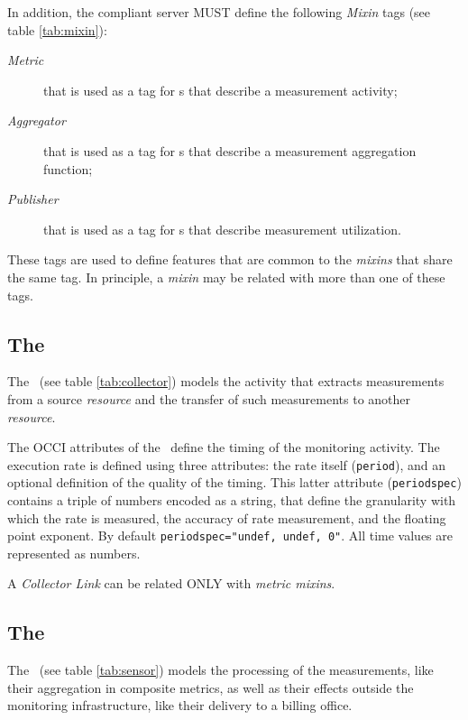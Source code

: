\documentclass[10pt]{article}  %
\begin{document}
In addition, the compliant server MUST define the following {\em Mixin} tags (see table \ref{tab:mixin}): 

\begin{description}

\item [{\em Metric}] that is used as a tag for \mi s that describe a measurement activity;

\item [{\em Aggregator}] that is used as a tag for \mi s that describe a measurement aggregation function;

\item [{\em Publisher}] that is used as a tag for \mi s that describe measurement utilization.

\end{description}

These tags are used to define features that are common to the {\em mixins} that share the same tag. In principle, a {\em mixin} may be related with more than one of these tags. 

\subsection{The \coll}



The \coll\ (see table \ref{tab:collector}) models the activity that extracts measurements from a source {\em resource} and the transfer of such measurements to another {\em resource}.

The OCCI attributes of the \coll\ define the timing of the monitoring activity.
The execution rate is defined using three attributes: the rate itself (\verb|period|), and an optional definition of the quality of the timing. This latter attribute (\verb|periodspec|) contains a triple of numbers encoded as a string, that define the granularity with which the rate is measured, the accuracy of rate measurement, and the floating point exponent. By default \verb|periodspec="undef, undef, 0"|. All time values are represented as numbers.

A {\em Collector Link} can be related ONLY with {\em metric mixins}.

\subsection{The \sens \label{sec:sensor}}



The \sens\ (see table \ref{tab:sensor}) models the processing of the measurements, like their aggregation in composite metrics, as well as their effects outside the monitoring infrastructure, like their delivery to a billing office.
\end{document}
